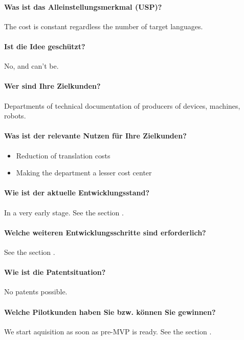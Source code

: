\documentclass{article}
\begin{document}
\paragraph{Was ist das Alleinstellungsmerkmal (USP)?}
The cost is constant regardless the number of target languages.

\paragraph{Ist die Idee geschützt?}
No, and can't be.

\paragraph{Wer sind Ihre Zielkunden?}
Departments of technical documentation of producers of devices, machines, robots.

\paragraph{Was ist der relevante Nutzen für Ihre Zielkunden?}
\begin{itemize}
\item Reduction of translation costs
\item Making the department a lesser cost center
\end{itemize}

\paragraph{Wie ist der aktuelle Entwicklungsstand?}
In a very early stage. See the section .

\paragraph{Welche weiteren Entwicklungsschritte sind erforderlich?}
See the section .

\paragraph{Wie ist die Patentsituation?}
No patents possible.

\paragraph{Welche Pilotkunden haben Sie bzw. können Sie gewinnen?}
We start aquisition as soon as pre-MVP is ready. See the section .
\end{document}
